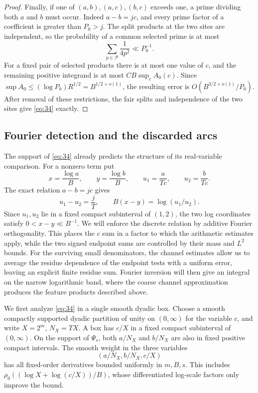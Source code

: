 \begin{proof}
Finally, if one of \((a,b),(a,c),(b,c)\) exceeds one, a prime dividing
both \(a\) and \(b\) must occur.  Indeed \(a-b=jc\), and every prime
factor of a coefficient is greater than \(P_0>j\).  The split products
at the two sites are independent, so the probability of a common
selected prime is at most
\[
 \sum_{p\in\mathcal P}\frac1{4p^2}\ll P_0^{-1}.
\]
For a fixed pair of selected products there is at most one value of
\(c\), and the remaining positive integrand is at most
\(C B\sup_c A_0(c)\).  Since
\(\sup A_0\le(\log P_0)R^{1/2}=B^{1/2+o(1)}\), the resulting error is
\(O(B^{3/2+o(1)}/P_0)\).  After removal of these restrictions, the fair
splits and independence of the two sites give \eqref{eq:34} exactly.
\end{proof}

\subsection{Fourier detection and the discarded arcs}

The support of \eqref{eq:34} already predicts the structure of its
real-variable comparison.  For a nonzero term put
\[
 x=\frac{\log a}{B},\qquad y=\frac{\log b}{B},\qquad
 u_1=\frac{a}{Tc},\qquad u_2=\frac{b}{Tc}.
\]
The exact relation \(a-b=jc\) gives
\[
 u_1-u_2=\frac jT,\qquad B(x-y)=\log(u_1/u_2).
\]
Since \(u_1,u_2\) lie in a fixed compact subinterval of \((1,2)\),
the two log coordinates satisfy \(0<x-y\ll B^{-1}\).
We will enforce the discrete relation by additive Fourier orthogonality.
This places the \(c\) sum in a factor to which the arithmetic estimates
apply, while the two signed endpoint sums are controlled by their mass and
\(L^2\) bounds.  For the surviving small denominators, the channel estimates
allow us to average the residue dependence of the endpoint tests with a
uniform error, leaving an explicit finite residue sum.  Fourier inversion
will then give an integral on the narrow logarithmic band, where the coarse
channel approximation produces the feature products described above.

We first analyze \eqref{eq:34} in a single smooth dyadic box.  Choose a
smooth compactly supported dyadic partition of unity on \((0,\infty)\)
for the variable \(c\), and write \(X=2^m\), \(N_X=TX\).  A box has
\(c/X\) in a fixed compact subinterval of \((0,\infty)\).  On the
support of \(\Psi_s\), both \(a/N_X\) and \(b/N_X\) are also in fixed
positive compact intervals.  The smooth weight in the three variables
\[
 (a/N_X,b/N_X,c/X)
\]
has all fixed-order derivatives bounded uniformly in \(m,B,s\).
This includes \(\rho_0((\log X+\log(c/X))/B)\), whose differentiated
log-scale factors only improve the bound.

